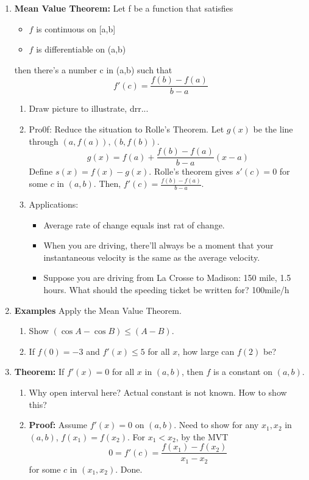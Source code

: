 \documentclass{article}
\begin{document}
\begin{enumerate}
\item {\bf Mean Value Theorem:} Let f be a function that satisfies
\begin{itemize}
\item $f$ is continuous on [a,b]
\item $f$ is differentiable on (a,b)
\end{itemize}
then there's a number c in (a,b) such that 
$$
f'(c) = \frac{f(b)-f(a)}{b-a}
$$
\begin{enumerate}
\item Draw picture to illustrate, drr...
\item Pro0f: Reduce the situation to Rolle's Theorem. Let $g(x)$ be the line through $(a,f(a)), (b,f(b))$.
\[
g(x) = f(a) + \frac{f(b)-f(a)}{b-a} (x-a)
\]
Define $s(x)=f(x)-g(x)$. Rolle's theorem gives $s'(c)=0$ for some $c$ in $(a,b)$. Then, $f'(c)=\frac{f(b)-f(a)}{b-a}$.
\item Applications: 
\begin{itemize}
\item Average rate of change equals inst rat of change.
\item When you are driving, there'll always be a moment that your instantaneous velocity is the same as the average velocity.
\item Suppose you are driving from La Crosse to Madison: 150 mile, 1.5 hours. What should the speeding ticket be written for? 100mile/h
\end{itemize}
\end{enumerate}

\item {\bf Examples} Apply the Mean Value Theorem.
\begin{enumerate}
\item Show $(\cos A-\cos B) \leq (A-B)$.
\item If $f(0)=-3$ and $f'(x)\leq 5$ for all $x$, how large can $f(2)$ be?
\end{enumerate}

\item {\bf Theorem:} If $f'(x) =0$ for all $x$ in $(a,b)$, then $f$ is a constant on $(a,b)$. 
\begin{enumerate}
\item Why open interval here? Actual constant is not known. How to show this?
\item {\bf Proof:} Assume $f'(x)=0$ on $(a,b)$. Need to show for any $x_1,x_2$ in $(a,b)$, $f(x_1)=f(x_2)$. For $x_1<x_2$, by the MVT
\[
0 = f'(c) = \frac{f(x_1)-f(x_2)}{x_1-x_2}
\]
for some $c$ in $(x_1,x_2)$. Done.
\end{enumerate}



\end{enumerate}
\end{document}
